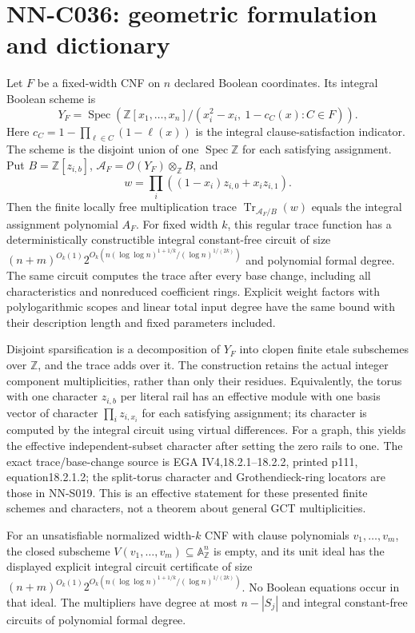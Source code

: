 \section{NN-C036: geometric formulation and dictionary}
\begin{geometricstatement}[NN-C036]
Let $F$ be a fixed-width CNF on $n$ declared Boolean coordinates. Its integral Boolean scheme is
\[
 Y_F=\operatorname{Spec}\!\left(
 \mathbb Z[x_1,\ldots,x_n]/(x_i^2-x_i,\ 1-c_C(x):C\in F)\right).
\]
Here $c_C=1-\prod_{\ell\in C}(1-\ell(x))$ is the integral clause-satisfaction indicator. The scheme is the disjoint union of one $\operatorname{Spec}\mathbb Z$ for each satisfying assignment. Put $B=\mathbb Z[z_{i,b}]$, $\mathscr A_F=\mathcal O(Y_F)\otimes_{\mathbb Z}B$, and
\[
                         w=\prod_i((1-x_i)z_{i,0}+x_i z_{i,1}).
\]
Then the finite locally free multiplication trace $\operatorname{Tr}_{\mathscr A_F/B}(w)$ equals the integral assignment polynomial $A_F$. For fixed width $k$, this regular trace function has a deterministically constructible integral constant-free circuit of size $(n+m)^{O_k(1)}2^{O_k(n(\log\log n)^{1+1/k}/(\log n)^{1/(2k)})}$ and polynomial formal degree. The same circuit computes the trace after every base change, including all characteristics and nonreduced coefficient rings. Explicit weight factors with polylogarithmic scopes and linear total input degree have the same bound with their description length and fixed parameters included.

Disjoint sparsification is a decomposition of $Y_F$ into clopen finite etale subschemes over $\mathbb Z$, and the trace adds over it. The construction retains the actual integer component multiplicities, rather than only their residues. Equivalently, the torus with one character $z_{i,b}$ per literal rail has an effective module with one basis vector of character $\prod_i z_{i,x_i}$ for each satisfying assignment; its character is computed by the integral circuit using virtual differences. For a graph, this yields the effective independent-subset character after setting the zero rails to one. The exact trace/base-change source is EGA IV4,18.2.1--18.2.2, printed p111, equation18.2.1.2; the split-torus character and Grothendieck-ring locators are those in NN-S019. This is an effective statement for these presented finite schemes and characters, not a theorem about general GCT multiplicities.

For an unsatisfiable normalized width-$k$ CNF with clause
polynomials $v_1,\ldots,v_m$, the closed subscheme
$V(v_1,\ldots,v_m)\subseteq\mathbb A^n_{\mathbb Z}$ is empty,
and its unit ideal has the displayed explicit integral
circuit certificate of size
$(n+m)^{O_k(1)}2^{O_k(n(\log\log n)^{1+1/k}/(\log n)^{1/(2k)})}$.
No Boolean equations occur in that ideal.  The multipliers
have degree at most $n-|S_j|$ and integral constant-free
circuits of polynomial formal degree.


\end{geometricstatement}
